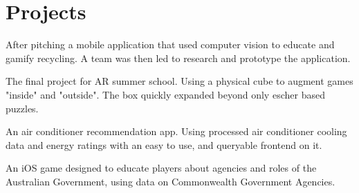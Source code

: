 \documentclass[a4paper]{deedy-resume} %
\begin{document}
\begin{minipage}[t]{0.66\textwidth}
\section{Projects}


After pitching a mobile application that used computer vision to educate and gamify recycling. %
A team was then led to research and prototype the application. %

\sectionspace %



The final project for AR summer school. Using a physical cube to augment games "inside" and "outside". The box quickly expanded beyond only escher based puzzles.%
\sectionspace %



An air conditioner recommendation app. Using processed air conditioner cooling data and energy ratings with an easy to use, and queryable frontend on it.

\sectionspace %



An iOS game designed to educate players about agencies and roles of the Australian Government, using data on Commonwealth Government Agencies.

\sectionspace %


\end{minipage}
\end{document}

